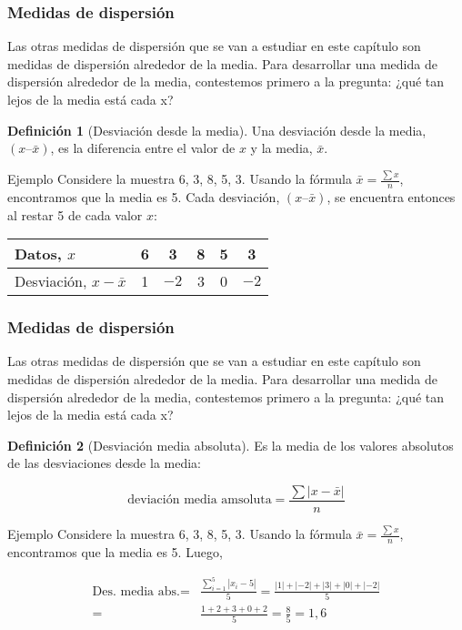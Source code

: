 \documentclass[10pt]{beamer}
\theoremstyle{plain} %
\theoremstyle{definition}
\newtheorem{defn}{Definición}
\theoremstyle{remark}
\begin{document}
\begin{frame}
\frametitle{Medidas de dispersión}
Las otras medidas de dispersión que se van a estudiar en este capítulo son medidas de dispersión alrededor de la media. Para desarrollar una medida de dispersión alrededor de la media, contestemos primero a la pregunta: ¿qué tan lejos de la media está cada x?
\begin{defn}[Desviación desde la media]
Una desviación desde la media, $(x – \bar{x} )$, es la diferencia
entre el valor de $x$ y la media, $\bar{x}$.
\end{defn}
\begin{exampleblock}{Ejemplo}
Considere la muestra 6, 3, 8, 5, 3. Usando la fórmula $\bar{x} =\frac{\sum x}{n}
$, encontramos
que la media es 5. Cada desviación, $(x – \bar{x})$, se encuentra entonces al restar 5 de
cada valor $x$:

\begin{center}
\begin{tabular}{l|ccccc}
Datos, $x$&6&3&8&5&3\\ \hline
Desviación, $x-\bar{x}$&1&$-2$&3&0&$-2$\\
\end{tabular}
\end{center}
\end{exampleblock}
\end{frame}


\begin{frame}
\frametitle{Medidas de dispersión}
Las otras medidas de dispersión que se van a estudiar en este capítulo son medidas de dispersión alrededor de la media. Para desarrollar una medida de dispersión alrededor de la media, contestemos primero a la pregunta: ¿qué tan lejos de la media está cada x?
\begin{defn}[Desviación media absoluta]
Es la media de los valores absolutos de las desviaciones desde la media:

$$\text{deviación media amsoluta}=\frac{\sum |x-\bar{x}|}{n}$$
\end{defn}
\begin{exampleblock}{Ejemplo}
Considere la muestra 6, 3, 8, 5, 3. Usando la fórmula $\bar{x} =\frac{\sum x}{n}
$, encontramos
que la media es 5. Luego,

$$
\begin{array}{rl}
\text{Des. media abs.}=&\frac{\sum_{i=1}^5|x_i-5|}{5}=\frac{|1|+|-2|+|3|+|0|+|-2|}{5}\\
=&\frac{1+2+3+0+2}{5}=\frac{8}{5}=1{,}6
\end{array}
$$


\end{exampleblock}
\end{frame}
\end{document}
